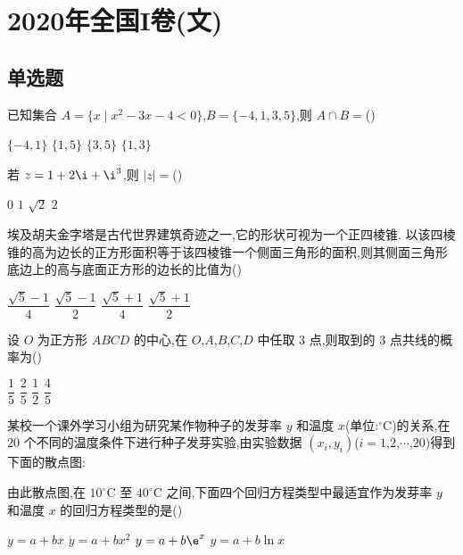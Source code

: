 \chapter{2020年全国I卷(文)}

\section{单选题}

\begin{problem}
已知集合 \(A=\{x\mid x^2-3x-4<0\}\),\(B=\{-4,1,3,5\}\),则 \(A\cap B=\)(\quad)

\choices
    {\(\{-4,1\}\)}
    {\(\{1,5\}\)}
    {\(\{3,5\}\)}
    {\(\{1,3\}\)}
\end{problem}

\begin{problem}
若 \(z=1+2\i+\i^3\),则 \(\lvert z\rvert=\)(\quad)

\choices
    {\(0\)}
    {\(1\)}
    {\(\sqrt{2}\)}
    {\(2\)}
\end{problem}

\begin{problem}
埃及胡夫金字塔是古代世界建筑奇迹之一,它的形状可视为一个正四棱锥. 以该四棱锥的高为边长的正方形面积等于该四棱锥一个侧面三角形的面积,则其侧面三角形底边上的高与底面正方形的边长的比值为(\quad)


\choices
    {\(\dfrac{\sqrt{5}-1}{4}\)}
    {\(\dfrac{\sqrt{5}-1}{2}\)}
    {\(\dfrac{\sqrt{5}+1}{4}\)}
    {\(\dfrac{\sqrt{5}+1}{2}\)}
\end{problem}

\begin{problem}
设 \(O\) 为正方形 \(ABCD\) 的中心,在 \(O\),\(A\),\(B\),\(C\),\(D\) 中任取 \(3\) 点,则取到的 \(3\) 点共线的概率为(\quad)

\choices
    {\(\dfrac{1}{5}\)}
    {\(\dfrac{2}{5}\)}
    {\(\dfrac{1}{2}\)}
    {\(\dfrac{4}{5}\)}
\end{problem}

\begin{problem}
某校一个课外学习小组为研究某作物种子的发芽率 \(y\) 和温度 \(x\)(单位:\(^{\circ}\mathrm{C}\))的关系,在 \(20\) 个不同的温度条件下进行种子发芽实验,由实验数据 \((x_i,y_i)\)(\(i=1\),\(2\),\(\cdots\),\(20\))得到下面的散点图:


由此散点图,在 \(10^{\circ}\mathrm{C}\) 至 \(40^{\circ}\mathrm{C}\) 之间,下面四个回归方程类型中最适宜作为发芽率 \(y\) 和温度 \(x\) 的回归方程类型的是(\quad)

\choices
    {\(y=a+bx\)}
    {\(y=a+bx^2\)}
    {\(y=a+b\e^x\)}
    {\(y=a+b\ln x\)}
\end{problem}

